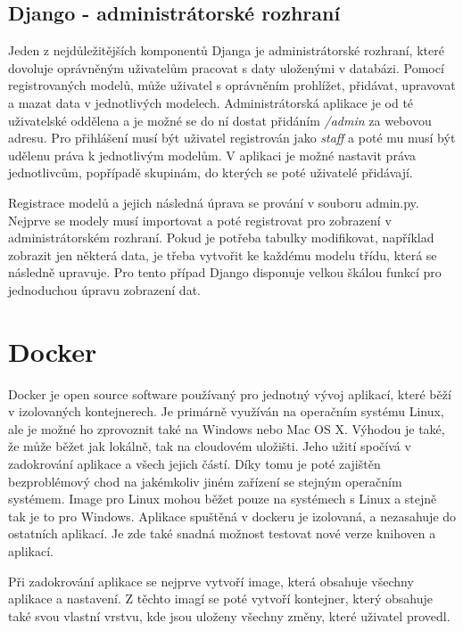 \subsection{Django - administrátorské rozhraní}

Jeden z nejdůležitějších komponentů Djanga je administrátorské
rozhraní, které dovoluje oprávněným uživatelům pracovat s daty
uloženými v databázi. Pomocí registrovaných modelů, může uživatel s
oprávněním prohlížet, přidávat, upravovat a mazat data v jednotlivých
modelech. Administrátorská aplikace je od té uživatelské oddělena a je
možné se do ní dostat přidáním \textit{/admin} za webovou adresu. Pro
přihlášení musí být uživatel registrován jako \textit{staff} a poté mu
musí být udělenu práva k jednotlivým modelům. V aplikaci je možné
nastavit práva jednotlivcům, popřípadě skupinám, do kterých se poté
uživatelé přidávají.

Registrace modelů a jejich následná úprava se prování v souboru
admin.py. Nejprve se modely musí importovat a poté registrovat pro
zobrazení v administrátorském rozhraní. Pokud je potřeba tabulky
modifikovat, například zobrazit jen některá data, je třeba vytvořit ke
každému modelu třídu, která se následně upravuje. Pro tento případ
Django disponuje velkou škálou funkcí pro jednoduchou úpravu zobrazení
dat.

\newpage

\section{Docker}

Docker je open source software používaný pro jednotný vývoj aplikací,
které běží v izolovaných kontejnerech. Je primárně využíván na
operačním systému Linux, ale je možné ho zprovoznit také na Windows
nebo Mac OS X. Výhodou je také, že může běžet jak lokálně, tak na
cloudovém uložišti. Jeho užití spočívá v zadokrování aplikace a všech
jejich částí. Díky tomu je poté zajištěn bezproblémový chod na
jakémkoliv jiném zařízení se stejným operačním systémem. Image pro
Linux mohou běžet pouze na systémech s Linux a stejně tak je to pro
Windows. Aplikace spuštěná v dockeru je izolovaná, a nezasahuje do
ostatních aplikací. Je zde také snadná možnost testovat nové verze
knihoven a aplikací.

Při zadokrování aplikace se nejprve vytvoří image, která obsahuje
všechny aplikace a nastavení. Z těchto imagí se poté vytvoří
kontejner, který obsahuje také svou vlastní vrstvu, kde jsou uloženy
všechny změny, které uživatel provedl.



